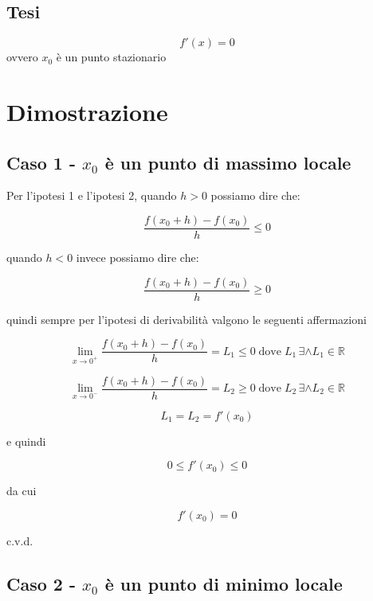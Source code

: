 \documentclass[../dimostrazioni]{subfiles}
\begin{document}
            \subsection*{Tesi}

                \[f'(x) = 0\] ovvero \(x_0\) è un punto stazionario

        \section*{Dimostrazione}

            \medskip

            \subsection*{Caso 1 - \(x_0\) è un punto di massimo locale}

                \smallskip

                Per l'ipotesi 1 e l'ipotesi 2, quando \(h>0\) possiamo dire che:
                
                \[\frac{f(x_0 + h) - f(x_0)}{h}  \leqslant 0\]

                quando \(h<0\) invece possiamo dire che:

                \[\frac{f(x_0 + h) - f(x_0)}{h}  \geqslant 0\]

                quindi sempre per l'ipotesi di derivabilità valgono le seguenti affermazioni
                
                \[\lim_{x\to 0^+} \frac{f(x_0 + h) - f(x_0)}{h} = L_1 \leqslant 0 \; \text{dove} \; L_1 \, \exists \land L_1 \in \mathbb{R} \]

                \[\lim_{x\to 0^-} \frac{f(x_0 + h) - f(x_0)}{h} = L_2  \geqslant 0 \; \text{dove} \; L_2 \, \exists \land L_2 \in \mathbb{R} \]

                \[L_1 = L_2 = f'(x_0)\]
                
                e quindi
                
                \[0 \leqslant f'(x_0) \leqslant 0\]
                
                da cui
                
                \[f'(x_0)=0\]
                
                c.v.d.

            \subsection*{Caso 2 - \(x_0\) è un punto di minimo locale}
\end{document}
